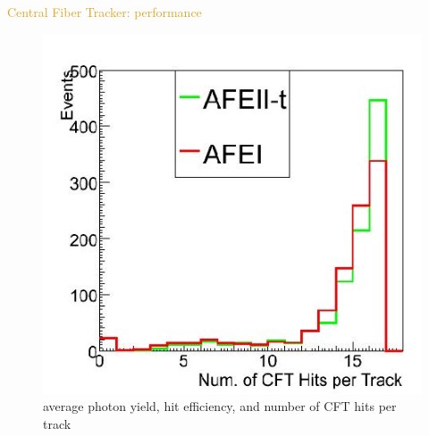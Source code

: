 \begin{frame}{\textcolor{Goldenrod}{Central Fiber Tracker: performance}}
\begin{overlayarea}{\textwidth}{\textheight}
\begin{figure}[h]
      \includegraphics[height=0.45\textheight]{./Images/24_CFT_performance}
      \caption*{{\scriptsize average photon yield, hit efficiency, and number of CFT
          hits per track}}
    \end{figure}
 \end{overlayarea}
\end{frame}



